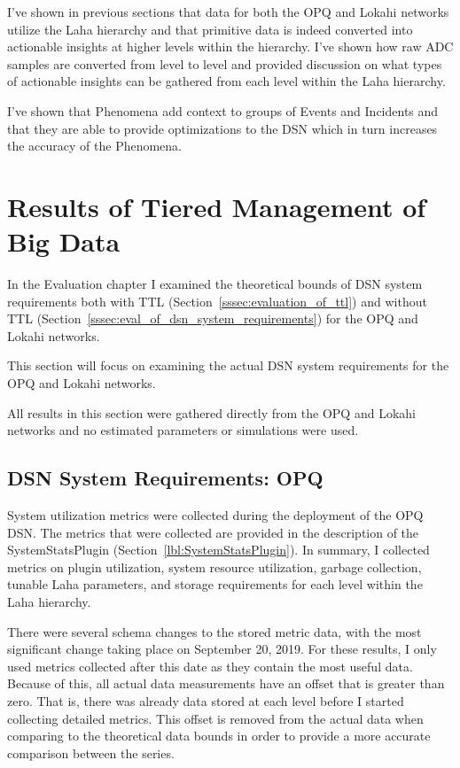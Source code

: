 I've shown in previous sections that data for both the OPQ and Lokahi networks utilize the Laha hierarchy and that primitive data is indeed converted into actionable insights at higher levels within the hierarchy. I've shown how raw ADC samples are converted from level to level and provided discussion on what types of actionable insights can be gathered from each level within the Laha hierarchy.

I've shown that Phenomena add context to groups of Events and Incidents and that they are able to provide optimizations to the DSN which in turn increases the accuracy of the Phenomena.

\section{Results of Tiered Management of Big Data}\label{sec:dsn-system-requirements}

In the Evaluation chapter I examined the theoretical bounds of DSN system requirements both with TTL (Section~\ref{sssec:evaluation_of_ttl}) and without TTL (Section~\ref{sssec:eval_of_dsn_system_requirements}) for the OPQ and Lokahi networks.

This section will focus on examining the actual DSN system requirements for the OPQ and Lokahi networks.

All results in this section were gathered directly from the OPQ and Lokahi networks and no estimated parameters or simulations were used.

\subsection{DSN System Requirements: OPQ}\label{subsec:dsn-system-requirements:-opq}

System utilization metrics were collected during the deployment of the OPQ DSN. The metrics that were collected are provided in the description of the SystemStatsPlugin (Section~\ref{lbl:SystemStatsPlugin}). In summary, I collected metrics on plugin utilization, system resource utilization, garbage collection, tunable Laha parameters, and storage requirements for each level within the Laha hierarchy.

There were several schema changes to the stored metric data, with the most significant change taking place on September 20, 2019. For these results, I only used metrics collected after this date as they contain the most useful data. Because of this, all actual data measurements have an offset that is greater than zero. That is, there was already data stored at each level before I started collecting detailed metrics. This offset is removed from the actual data when comparing to the theoretical data bounds in order to provide a more accurate comparison between the series.

